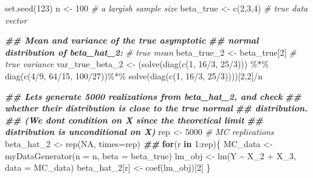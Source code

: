 \documentclass[
  14pt,
]{memoir}
\newenvironment{Shaded}{\begin{snugshade}}{\end{snugshade}}
\newcommand{\AttributeTok}[1]{\textcolor[rgb]{0.77,0.63,0.00}{#1}}
\newcommand{\CommentTok}[1]{\textcolor[rgb]{0.56,0.35,0.01}{\textit{#1}}}
\newcommand{\ConstantTok}[1]{\textcolor[rgb]{0.00,0.00,0.00}{#1}}
\newcommand{\ControlFlowTok}[1]{\textcolor[rgb]{0.13,0.29,0.53}{\textbf{#1}}}
\newcommand{\DecValTok}[1]{\textcolor[rgb]{0.00,0.00,0.81}{#1}}
\newcommand{\DocumentationTok}[1]{\textcolor[rgb]{0.56,0.35,0.01}{\textbf{\textit{#1}}}}
\newcommand{\FunctionTok}[1]{\textcolor[rgb]{0.00,0.00,0.00}{#1}}
\newcommand{\NormalTok}[1]{#1}
\newcommand{\OtherTok}[1]{\textcolor[rgb]{0.56,0.35,0.01}{#1}}
\newcommand{\SpecialCharTok}[1]{\textcolor[rgb]{0.00,0.00,0.00}{#1}}
\begin{document}
\begin{Shaded}
\begin{Highlighting}[]
\FunctionTok{set.seed}\NormalTok{(}\DecValTok{123}\NormalTok{)}
\NormalTok{n           }\OtherTok{\textless{}{-}} \DecValTok{100}      \CommentTok{\# a largish sample size}
\NormalTok{beta\_true   }\OtherTok{\textless{}{-}} \FunctionTok{c}\NormalTok{(}\DecValTok{2}\NormalTok{,}\DecValTok{3}\NormalTok{,}\DecValTok{4}\NormalTok{) }\CommentTok{\# true data vector}

\DocumentationTok{\#\# Mean and variance of the true asymptotic }
\DocumentationTok{\#\# normal distribution of beta\_hat\_2:}
\CommentTok{\# true mean}
\NormalTok{beta\_true\_2     }\OtherTok{\textless{}{-}}\NormalTok{ beta\_true[}\DecValTok{2}\NormalTok{] }
\CommentTok{\# true variance}
\NormalTok{var\_true\_beta\_2 }\OtherTok{\textless{}{-}}\NormalTok{ (}\FunctionTok{solve}\NormalTok{(}\FunctionTok{diag}\NormalTok{(}\FunctionTok{c}\NormalTok{(}\DecValTok{1}\NormalTok{, }\DecValTok{16}\SpecialCharTok{/}\DecValTok{3}\NormalTok{, }\DecValTok{25}\SpecialCharTok{/}\DecValTok{3}\NormalTok{)))    }\SpecialCharTok{\%*\%} 
                          \FunctionTok{diag}\NormalTok{(}\FunctionTok{c}\NormalTok{(}\DecValTok{4}\SpecialCharTok{/}\DecValTok{9}\NormalTok{, }\DecValTok{64}\SpecialCharTok{/}\DecValTok{15}\NormalTok{, }\DecValTok{100}\SpecialCharTok{/}\DecValTok{27}\NormalTok{))}\SpecialCharTok{\%*\%} 
                    \FunctionTok{solve}\NormalTok{(}\FunctionTok{diag}\NormalTok{(}\FunctionTok{c}\NormalTok{(}\DecValTok{1}\NormalTok{, }\DecValTok{16}\SpecialCharTok{/}\DecValTok{3}\NormalTok{, }\DecValTok{25}\SpecialCharTok{/}\DecValTok{3}\NormalTok{))))[}\DecValTok{2}\NormalTok{,}\DecValTok{2}\NormalTok{]}\SpecialCharTok{/}\NormalTok{n}

\DocumentationTok{\#\# Let\textquotesingle{}s generate 5000 realizations from beta\_hat\_2, and check }
\DocumentationTok{\#\# whether their distribution is close to the true normal }
\DocumentationTok{\#\# distribution.}
\DocumentationTok{\#\# (We don\textquotesingle{}t condition on X since the theoretical limit }
\DocumentationTok{\#\# distribution is unconditional on X)}
\NormalTok{rep        }\OtherTok{\textless{}{-}} \DecValTok{5000} \CommentTok{\# MC replications}
\NormalTok{beta\_hat\_2 }\OtherTok{\textless{}{-}} \FunctionTok{rep}\NormalTok{(}\ConstantTok{NA}\NormalTok{, }\AttributeTok{times=}\NormalTok{rep)}
\DocumentationTok{\#\#}
\ControlFlowTok{for}\NormalTok{(r }\ControlFlowTok{in} \DecValTok{1}\SpecialCharTok{:}\NormalTok{rep)\{}
\NormalTok{    MC\_data }\OtherTok{\textless{}{-}} \FunctionTok{myDataGenerator}\NormalTok{(}\AttributeTok{n    =}\NormalTok{ n, }
                               \AttributeTok{beta =}\NormalTok{ beta\_true)}
\NormalTok{    lm\_obj        }\OtherTok{\textless{}{-}} \FunctionTok{lm}\NormalTok{(Y }\SpecialCharTok{\textasciitilde{}}\NormalTok{ X\_2 }\SpecialCharTok{+}\NormalTok{ X\_3, }\AttributeTok{data =}\NormalTok{ MC\_data)}
\NormalTok{    beta\_hat\_2[r] }\OtherTok{\textless{}{-}} \FunctionTok{coef}\NormalTok{(lm\_obj)[}\DecValTok{2}\NormalTok{]}
\NormalTok{\}}


\end{Highlighting}
\end{Shaded}
\end{document}
